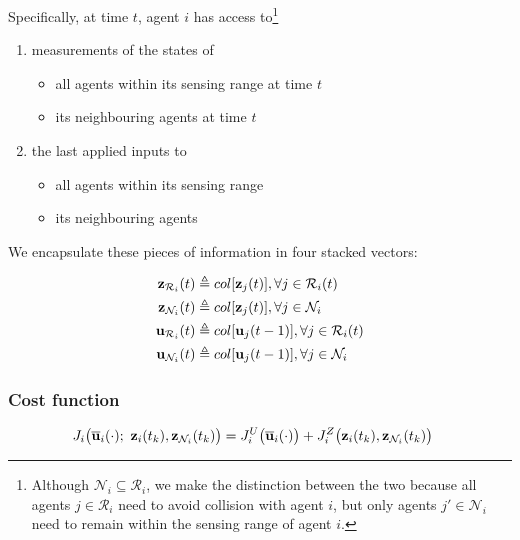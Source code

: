 Specifically, at time $t$, agent $i$ has access to\footnote{Although
    $\mathcal{N}_i \subseteq \mathcal{R}_i$, we make the distinction between
    the two because all agents $j \in \mathcal{R}_i$ need to avoid collision
    with agent $i$, but only agents $j' \in \mathcal{N}_i$ need to remain
    within the sensing range of agent $i$.}

\begin{enumerate}
  \item measurements of the states of
    \begin{itemize}
      \item all agents within its sensing range at time $t$
      \item its neighbouring agents at time $t$
      \end{itemize}
    \item the last applied inputs to
      \begin{itemize}
        \item all agents within its sensing range
        \item its neighbouring agents
      \end{itemize}
\end{enumerate}

We encapsulate these pieces of information in four stacked vectors:

\begin{align}
  \bm{\mathbf{z}}_{\mathcal{R}_i}(t) &\triangleq col[\bm{\mathbf{z}}_j(t)], \forall j \in \mathcal{R}_i(t) \\
  \bm{\mathbf{z}}_{\mathcal{N}_i}(t) &\triangleq col[\bm{\mathbf{z}}_j(t)], \forall j \in \mathcal{N}_i \\
  \bm{\mathbf{u}}_{\mathcal{R}_i}(t) &\triangleq col[\bm{\mathbf{u}}_j(t-1)], \forall j \in \mathcal{R}_i(t) \\
  \bm{\mathbf{u}}_{\mathcal{N}_i}(t) &\triangleq col[\bm{\mathbf{u}}_j(t-1)], \forall j \in \mathcal{N}_i
\end{align}


\subsubsection{Cost function}

\begin{align}
  J_i \big(\overline{\bm{\mathbf{u}}}_i (\cdot);\ \bm{\mathbf{z}}_i(t_k), \bm{\mathbf{z}}_{\mathcal{N}_i}(t_k)\big) &=
    J_i^U \big(\overline{\bm{\mathbf{u}}}_i (\cdot) \big) +
    J_i^Z \big(\bm{\mathbf{z}}_i (t_k), \bm{\mathbf{z}}_{\mathcal{N}_i}(t_k)\big)
\end{align}

